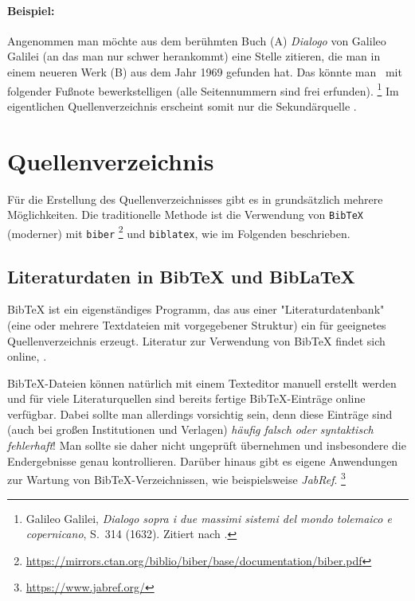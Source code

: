 \paragraph{Beispiel:} Angenommen man möchte aus dem berühmten Buch (\textrm{A}) 
\emph{Dialogo} von Galileo Galilei (an das man nur schwer herankommt) eine Stelle
zitieren, die man in einem neueren Werk (\textrm{B}) aus dem Jahr 1969 gefunden 
hat. Das könnte man \zB\ mit folgender Fußnote bewerkstelligen (alle Seitennummern
sind frei erfunden).%
\footnote{Galileo Galilei, \emph{Dialogo sopra i due massimi sistemi del
mondo tolemaico e copernicano}, S.~314 (1632). Zitiert nach
\cite[S.~59]{Hemleben1969}.}
Im eigentlichen Quellenverzeichnis erscheint somit nur die Sekundärquelle
\cite{Hemleben1969}.


\section{Quellenverzeichnis}
\label{sec:quellenverzeichnis}

Für die Erstellung des Quellenverzeichnisses gibt es in \latex grundsätzlich
mehrere Möglichkeiten. Die traditionelle Methode ist die Verwendung von
\texttt{BibTeX} \cite{Patashnik1988} \bzw (moderner) mit \texttt{biber}%
\footnote{\url{https://mirrors.ctan.org/biblio/biber/base/documentation/biber.pdf}}
und \texttt{biblatex}, wie im Folgenden beschrieben.

\subsection{Literaturdaten in BibTeX und BibLaTeX}
\label{sec:bibtex}

BibTeX ist ein eigenständiges Programm, das aus einer "Literaturdatenbank"
(eine oder mehrere Textdateien mit vorgegebener Struktur) ein für \latex
geeignetes Quellenverzeichnis erzeugt. Literatur zur Verwendung von BibTeX
findet sich online, \zB \cite{Feder2006, Patashnik1988}.

BibTeX-Dateien können natürlich mit einem Texteditor manuell erstellt werden
und für viele Literaturquellen sind bereits fertige BibTeX-Einträge online
verfügbar. Dabei sollte man allerdings vorsichtig sein, denn diese Einträge
sind (auch bei großen Institutionen und Verlagen) \emph{häufig falsch oder
syntaktisch fehlerhaft}! Man sollte sie daher nicht ungeprüft übernehmen und
insbesondere die Endergebnisse genau kontrollieren. Darüber hinaus gibt es
eigene Anwendungen zur Wartung von BibTeX-Verzeichnissen, wie beispielsweise
\emph{JabRef}.%
\footnote{\url{https://www.jabref.org/}}

